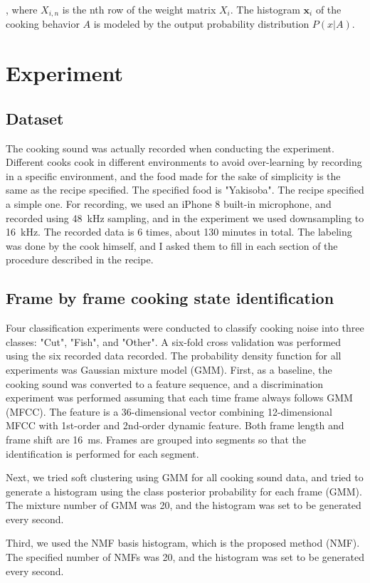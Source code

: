 \documentclass[sigchi]{acmart}
\begin{document}
, where $ X_ {i, n} $ is the nth row of the weight matrix $ X_i $.
The histogram $ \bm {x} _i $ of the cooking behavior $ A $ is modeled by the output probability distribution $ P (x | A) $.

\section{Experiment}
\subsection{Dataset}
The cooking sound was actually recorded when conducting the experiment. Different cooks cook in different environments to avoid over-learning by recording in a specific environment, and the food made for the sake of simplicity is the same as the recipe specified.
The specified food is "Yakisoba". The recipe specified a simple one.
For recording, we used an iPhone 8 built-in microphone, and recorded using \SI{48}{kHz} sampling, and in the experiment we used downsampling to \SI{16}{kHz}. The recorded data is 6 times, about 130 minutes in total.
The labeling was done by the cook himself, and I asked them to fill in each section of the procedure described in the recipe.

\subsection{Frame by frame cooking state identification}
Four classification experiments were conducted to classify cooking noise into three classes: "Cut", "Fish", and "Other". A six-fold cross validation was performed using the six recorded data recorded. The probability density function for all experiments was Gaussian mixture model (GMM).
First, as a baseline, the cooking sound was converted to a feature sequence, and a discrimination experiment was performed assuming that each time frame always follows GMM (MFCC).
The feature is a 36-dimensional vector combining 12-dimensional MFCC with 1st-order and 2nd-order dynamic feature. Both frame length and frame shift are \SI{16}{ms}. Frames are grouped into segments so that the identification is performed for each segment.

Next, we tried soft clustering using GMM for all cooking sound data, and tried to generate a histogram using the class posterior probability for each frame (GMM). The mixture number of GMM was 20, and the histogram was set to be generated every second.

Third, we used the NMF basis histogram, which is the proposed method (NMF). The specified number of NMFs was 20, and the histogram was set to be generated every second.
\end{document}
